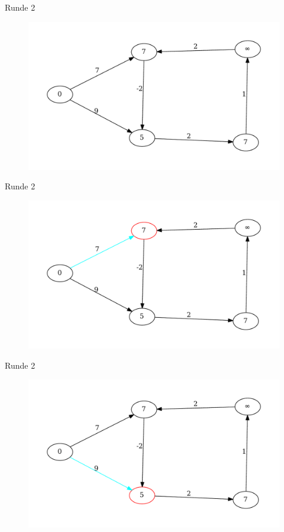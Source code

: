 \begin{frame}{Runde 2}
\begin{figure}[htbp]
\centering
\includegraphics[width=\linewidth]{bellman_ford_graphs/graph_07.pdf}
\end{figure}
\end{frame}

\begin{frame}{Runde 2}
\begin{figure}[htbp]
\centering
\includegraphics[width=\linewidth]{bellman_ford_graphs/graph_08.pdf}
\end{figure}
\end{frame}

\begin{frame}{Runde 2}
\begin{figure}[htbp]
\centering
\includegraphics[width=\linewidth]{bellman_ford_graphs/graph_09.pdf}
\end{figure}
\end{frame}

